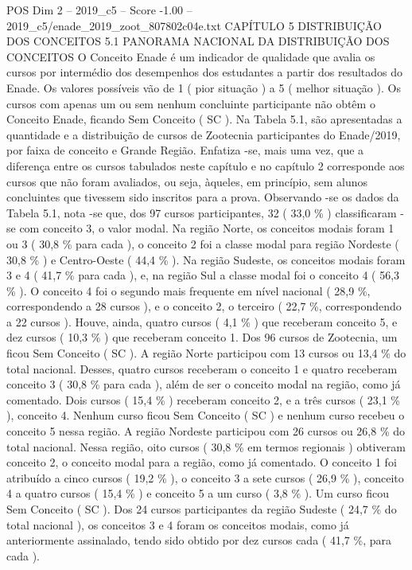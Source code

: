 \begin{textsample}{POS Dim 2 – 2019\_c5 – Score -1.00 – 2019\_c5/enade\_2019\_zoot\_807802c04e.txt}  \label{ex:f2_pos_339}
CAPÍTULO 5 DISTRIBUIÇÃO DOS CONCEITOS 5.1 PANORAMA NACIONAL DA DISTRIBUIÇÃO DOS CONCEITOS O Conceito Enade é um indicador de qualidade que avalia os cursos por intermédio dos desempenhos dos estudantes a partir dos resultados do Enade.
Os valores possíveis vão de 1 ( pior situação ) a 5 ( melhor situação ).
Os cursos com apenas um ou sem nenhum concluinte participante não obtêm o Conceito Enade, ficando Sem Conceito ( SC ).
Na Tabela 5.1, são apresentadas a quantidade e a distribuição de cursos de Zootecnia participantes do Enade/2019, por faixa de conceito e Grande Região.
Enfatiza -se, mais uma vez, que a diferença entre os cursos tabulados neste capítulo e no capítulo 2 corresponde aos cursos que não foram avaliados, ou seja, àqueles, em princípio, sem alunos concluintes que tivessem sido inscritos para a prova.
Observando -se os dados da Tabela 5.1, nota -se que, dos 97 cursos participantes, 32 ( 33,0 \% ) classificaram -se com conceito 3, o valor modal.
Na região Norte, os conceitos modais foram 1 ou 3 ( 30,8 \% para cada ), o conceito 2 foi a classe modal para região Nordeste ( 30,8 \% ) e Centro-Oeste ( 44,4 \% ).
Na região Sudeste, os conceitos modais foram 3 e 4 ( 41,7 \% para cada ), e, na região Sul a classe modal foi o conceito 4 ( 56,3 \% ).
O conceito 4 foi o segundo mais frequente em nível nacional ( 28,9 \%, correspondendo a 28 cursos ), e o conceito 2, o terceiro ( 22,7 \%, correspondendo a 22 cursos ).
Houve, ainda, quatro cursos ( 4,1 \% ) que receberam conceito 5, e dez cursos ( 10,3 \% ) que receberam conceito 1.
Dos 96 cursos de Zootecnia, um ficou Sem Conceito ( SC ).
A região Norte participou com 13 cursos ou 13,4 \% do total nacional.
Desses, quatro cursos receberam o conceito 1 e quatro receberam conceito 3 ( 30,8 \% para cada ), além de ser o conceito modal na região, como já comentado.
Dois cursos ( 15,4 \% ) receberam conceito 2, e a três cursos ( 23,1 \% ), conceito 4.
Nenhum curso ficou Sem Conceito ( SC ) e nenhum curso recebeu o conceito 5 nessa região.
A região Nordeste participou com 26 cursos ou 26,8 \% do total nacional.
Nessa região, oito cursos ( 30,8 \% em termos regionais ) obtiveram conceito 2, o conceito modal para a região, como já comentado.
O conceito 1 foi atribuído a cinco cursos ( 19,2 \% ), o conceito 3 a sete cursos ( 26,9 \% ), conceito 4 a quatro cursos ( 15,4 \% ) e conceito 5 a um curso ( 3,8 \% ).
Um curso ficou Sem Conceito ( SC ).
Dos 24 cursos participantes da região Sudeste ( 24,7 \% do total nacional ), os conceitos 3 e 4 foram os conceitos modais, como já anteriormente assinalado, tendo sido obtido por dez cursos cada ( 41,7 \%, para cada ).

\end{textsample}
